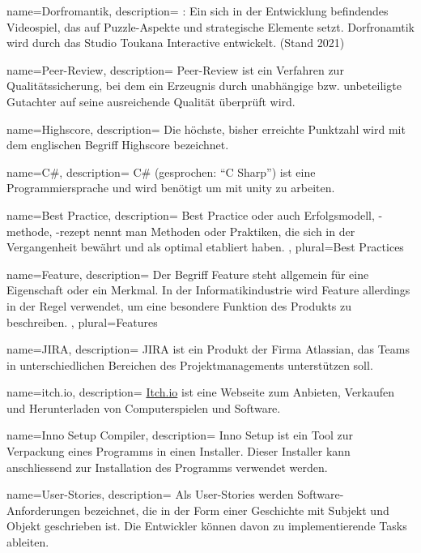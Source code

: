 {
	name=Dorfromantik,
	description={
		\cite{DorfromantikHomepage}: Ein sich in der Entwicklung befindendes Videospiel, das auf Puzzle-Aspekte und strategische Elemente setzt. Dorfronamtik wird durch das Studio Toukana Interactive entwickelt. (Stand 2021)
	}
}

{
	name=Peer-Review,
	description={
		Peer-Review ist ein Verfahren zur Qualitätssicherung, bei dem ein Erzeugnis durch unabhängige bzw. unbeteiligte Gutachter auf seine ausreichende Qualität überprüft wird.
	}
}

{
	name=Highscore,
	description={
		Die höchste, bisher erreichte Punktzahl wird mit dem englischen Begriff Highscore bezeichnet.
	}
}

{
	name=C\#,
	description={
		C\# (gesprochen: \enquote{C Sharp}) ist eine Programmiersprache und wird benötigt um mit \gls{unity} zu arbeiten.
	}
}

{
	name=Best Practice,
	description={
		Best Practice oder auch Erfolgsmodell, -methode, -rezept nennt man Methoden oder Praktiken, die sich in der Vergangenheit bewährt und als optimal etabliert haben.
	},
	plural={Best Practices}
}

{
	name=Feature,
	description={
		Der Begriff Feature steht allgemein für eine Eigenschaft oder ein Merkmal. In der Informatikindustrie wird Feature allerdings in der Regel verwendet, um eine besondere Funktion des Produkts zu beschreiben.
	},
	plural={Features}
}

{
	name=JIRA,
	description={
		JIRA ist ein Produkt der Firma Atlassian, das Teams in unterschiedlichen Bereichen des Projektmanagements unterstützen soll.
	}
}

{
	name=itch.io,
	description={
		\href{https://itch.io/}{Itch.io} ist eine Webseite zum Anbieten, Verkaufen und Herunterladen von Computerspielen und Software.
	}
}

{
	name=Inno Setup Compiler,
	description={
		Inno Setup ist ein Tool zur Verpackung eines Programms in einen Installer. Dieser Installer kann anschliessend zur Installation des Programms verwendet werden.
	}
}

{
	name=User-Stories,
	description={
		Als User-Stories werden Software-Anforderungen bezeichnet, die in der Form einer Geschichte mit Subjekt und Objekt geschrieben ist. Die Entwickler können davon zu implementierende Tasks ableiten.
	}
}

